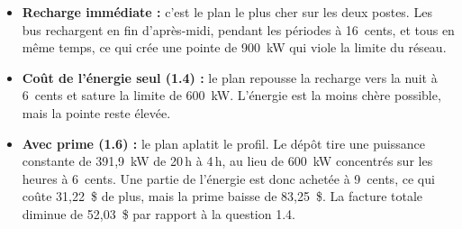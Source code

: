 \documentclass{article}
\begin{document}
\begin{itemize}
  \item \textbf{Recharge immédiate :} c'est le plan le plus cher sur les deux postes. Les bus rechargent en fin d'après-midi, pendant les périodes à 16~cents, et tous en même temps, ce qui crée une pointe de 900~kW qui viole la limite du réseau.
  \item \textbf{Coût de l'énergie seul (1.4) :} le plan repousse la recharge vers la nuit à 6~cents et sature la limite de 600~kW. L'énergie est la moins chère possible, mais la pointe reste élevée.
  \item \textbf{Avec prime (1.6) :} le plan aplatit le profil. Le dépôt tire une puissance constante de 391,9~kW de 20\,h à 4\,h, au lieu de 600~kW concentrés sur les heures à 6~cents. Une partie de l'énergie est donc achetée à 9~cents, ce qui coûte 31,22~\$ de plus, mais la prime baisse de 83,25~\$. La facture totale diminue de 52,03~\$ par rapport à la question 1.4.
\end{itemize}
\end{document}
